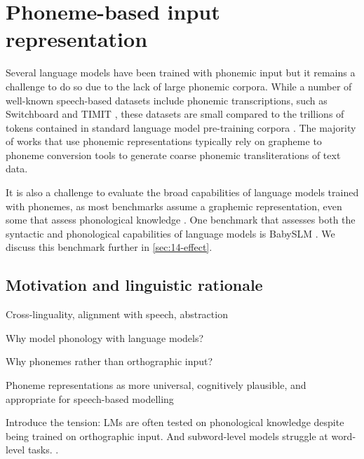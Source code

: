 \section{Phoneme-based input representation}\label{sec:12-phonemic}

Several language models have been trained with phonemic input \citep{sundararaman-2021-phonemebert, gale-etal-2023-bort} but it remains a challenge to do so due to the lack of large phonemic corpora. While a number of well-known speech-based datasets include phonemic transcriptions, such as Switchboard \citep{godfrey1992switchboard} and TIMIT \citep{garofolo1993darpa}, these datasets are small compared to the trillions of tokens contained in standard language model pre-training corpora \citep{elazar-2024-redpajama}. The majority of works that use phonemic representations typically rely on grapheme to phoneme conversion tools \citep{bisani-2008-g2p, hasegawa-2020-g2pmultilingual} to generate coarse phonemic transliterations of text data.

It is also a challenge to evaluate the broad capabilities of language models trained with phonemes, as most benchmarks assume a graphemic representation, even some that assess phonological knowledge \citep{suvarna-etal-2024-phonologybench}. One benchmark that assesses both the syntactic and phonological capabilities of language models is BabySLM \citep{lavechin}. %
We discuss this benchmark further in \cref{sec:14-effect}.

\citep{nguyen-2022-word-boundaries,bunzeck2024graphemes}

\subsection{Motivation and linguistic rationale}

Cross-linguality, alignment with speech, abstraction

Why model phonology with language models?

Why phonemes rather than orthographic input?

Phoneme representations as more universal, cognitively plausible, and appropriate for speech-based modelling

Introduce the tension: LMs are often tested on phonological knowledge despite being trained on orthographic input. And subword-level models struggle at word-level tasks.
\citet{sims2025stochastokimprovingfinegrainedsubword}.
